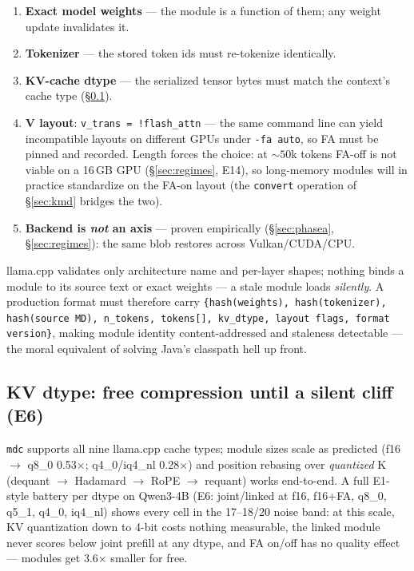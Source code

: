 \documentclass[11pt]{article}
\newcommand{\mdc}{\texttt{mdc}}
\newcommand{\code}[1]{\texttt{#1}}
\begin{document}
\begin{enumerate}
  \item \textbf{Exact model weights} --- the module is a function of them; any weight update invalidates it.
  \item \textbf{Tokenizer} --- the stored token ids must re-tokenize identically.
  \item \textbf{KV-cache dtype} --- the serialized tensor bytes must match the context's cache type (\S\ref{sec:dtype}).
  \item \textbf{V layout}: \code{v\_trans = !flash\_attn} --- the same command line can yield incompatible layouts on different GPUs under \code{-fa auto}, so FA must be pinned and recorded. Length forces the choice: at ${\sim}50$k tokens FA-off is not viable on a 16\,GB GPU (\S\ref{sec:regimes}, E14), so long-memory modules will in practice standardize on the FA-on layout (the \code{convert} operation of \S\ref{sec:kmd} bridges the two).
  \item \textbf{Backend is \emph{not} an axis} --- proven empirically (\S\ref{sec:phasea}, \S\ref{sec:regimes}): the same blob restores across Vulkan/CUDA/CPU.
\end{enumerate}

llama.cpp validates only architecture name and per-layer shapes; nothing binds a module to its source text or exact weights --- a stale module loads \emph{silently}. A production format must therefore carry \code{\{hash(weights), hash(tokenizer), hash(source MD), n\_tokens, tokens[], kv\_dtype, layout flags, format version\}}, making module identity content-addressed and staleness detectable --- the moral equivalent of solving Java's classpath hell up front.

\subsection{KV dtype: free compression until a silent cliff (E6)}
\label{sec:dtype}

\mdc{} supports all nine llama.cpp cache types; module sizes scale as predicted (f16 $\to$ q8\_0 0.53$\times$; q4\_0/iq4\_nl 0.28$\times$) and position rebasing over \emph{quantized} K (dequant $\to$ Hadamard $\to$ RoPE $\to$ requant) works end-to-end. A full E1-style battery per dtype on Qwen3-4B (E6: joint/linked at f16, f16+FA, q8\_0, q5\_1, q4\_0, iq4\_nl) shows every cell in the 17--18/20 noise band: at this scale, KV quantization down to 4-bit costs nothing measurable, the linked module never scores below joint prefill at any dtype, and FA on/off has no quality effect --- modules get 3.6$\times$ smaller for free.
\end{document}
